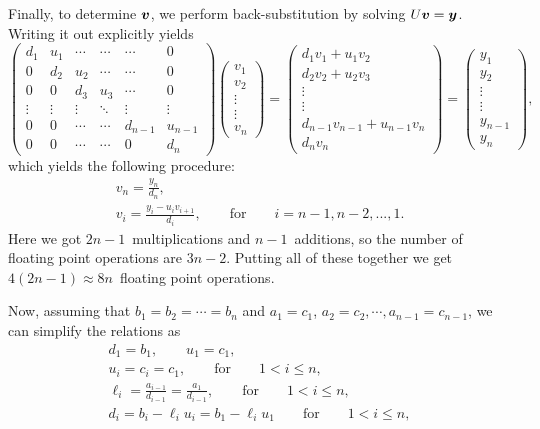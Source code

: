 \documentclass[english,notitlepage]{revtex4-1}  %
\begin{document}
Finally, to determine $\vb*{v}$, we perform back-substitution by solving $U\vb*{v} = \vb*{y}$. Writing it out explicitly yields 
\begin{equation}
	\begin{pmatrix}
	d_1 & u_1 & \cdots & \cdots &\cdots & 0 \\ 
	0 & d_2 & u_2 & \cdots & \cdots & 0 \\
	0 & 0 & d_3 & u_3 & \cdots & 0 \\
	\vdots & \vdots & \vdots & \ddots & \vdots & \vdots \\
	0 & 0 & \cdots & \cdots & d_{n-1} & u_{n-1} \\
	0 & 0 & \cdots & \cdots & 0 & d_n
	\end{pmatrix}
	\begin{pmatrix}
	v_1 \\ v_2 \\ \vdots \\ \vdots \\ v_n
	\end{pmatrix}
	= 
	\begin{pmatrix}
	d_1v_1 + u_1v_2 \\
	d_2v_2 + u_2v_3 \\ 
	\vdots \\ 
	\vdots \\
	d_{n-1}v_{n-1} + u_{n-1}v_n \\ 
	d_nv_n
	\end{pmatrix}
	=
	\begin{pmatrix}
	y_1 \\ y_2 \\ \vdots \\ \vdots \\ y_{n-1} \\ y_n 
	\end{pmatrix},
\end{equation}
which yields the following procedure: 
\begin{gather}
	v_n = \frac{y_n}{d_n}, \\
	v_i = \frac{y_i - u_iv_{i+1}}{d_i}, \qquad \text{for} \qquad i = n-1, n-2, ..., 1.
\end{gather}
Here we got $2n-1$ multiplications and $n-1$ additions, so the number of floating point operations are $3n-2$. Putting all of these together we get $4(2n-1) \approx 8n $ floating point operations.


Now, assuming that $b_1 = b_2 = \cdots = b_n$ and $a_1 = c_1$, $a_2 = c_2,  \cdots, a_{n-1} = c_{n-1}$, we can simplify the relations as 
\begin{gather}
	d_1 = b_1, \qquad u_1 = c_1, \\
	u_i = c_i = c_1, \qquad \text{for} \qquad 1 < i \leq n,\\
	\ell_i = \frac{a_{i-1}}{d_{i-1}} = \frac{a_1}{d_{i-1}}, \qquad \text{for} \qquad 1 < i \leq n,\\
	d_i = b_i - \ell_iu_i = b_1 - \ell_iu_1 \qquad \text{for} \qquad 1 < i \leq n,
\end{gather}
\end{document}
